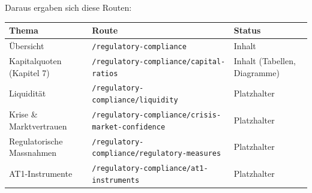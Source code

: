\documentclass[11pt,a4paper]{article}
\begin{document}
Daraus ergaben sich diese Routen:
\begin{center}
\footnotesize
\begin{tabular}{@{}>{\raggedright\arraybackslash}p{3.5cm} >{\raggedright\arraybackslash}p{7.3cm} >{\raggedright\arraybackslash}p{3.6cm}@{}}
\toprule
\textbf{Thema} & \textbf{Route} & \textbf{Status} \\
\midrule
Übersicht & \texttt{/regulatory-compliance} & Inhalt \\
Kapitalquoten (Kapitel 7) & \texttt{/regulatory-compliance/\allowbreak capital-ratios} & Inhalt (Tabellen, Diagramme) \\
Liquidität & \texttt{/regulatory-compliance/\allowbreak liquidity} & Platzhalter \\
Krise \& Marktvertrauen & \texttt{/regulatory-compliance/\allowbreak crisis-market-confidence} & Platzhalter \\
Regulatorische Massnahmen & \texttt{/regulatory-compliance/\allowbreak regulatory-measures} & Platzhalter \\
AT1-Instrumente & \texttt{/regulatory-compliance/\allowbreak at1-instruments} & Platzhalter \\
\bottomrule
\end{tabular}
\end{center}
\end{document}
